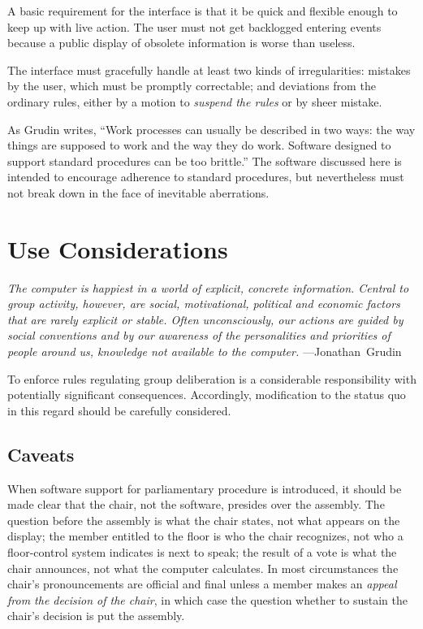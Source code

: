 \documentclass{acm_proc_article-sp}
\begin{document}
A basic requirement for the interface is that it be quick and flexible enough to keep up with live action. The user must not get backlogged entering events because a public display of obsolete information is worse than useless.

The interface must gracefully handle at least two kinds of irregularities: mistakes by the user, which must be promptly correctable; and deviations from the ordinary rules, either by a motion to \emph{suspend the rules} or by sheer mistake.

As Grudin writes, ``Work processes can usually be described in two ways: the way things are supposed to work and the way they do work. Software designed to support standard procedures can be too brittle.'' \cite{grudin:groupware} The software discussed here is intended to encourage adherence to standard procedures, but nevertheless must not break down in the face of inevitable aberrations.

\section{Use Considerations}  %

{ \it
The computer is happiest in a world of explicit, concrete information. Central to group activity, however, are social, motivational, political and economic factors that are rarely explicit or stable. Often unconsciously, our actions are guided by social conventions and by our awareness of the personalities and priorities of people around us, knowledge not available to the computer.
}
\hfill
---Jonathan~Grudin

To enforce rules regulating group deliberation is a considerable responsibility with potentially significant consequences. Accordingly, modification to the status quo in this regard should be carefully considered.

\subsection{Caveats}
\label{sec:caveats}


When software support for parliamentary procedure is introduced, it should be made clear that the chair, not the software, presides over the assembly. The question before the assembly is what the chair states, not what appears on the display; the member entitled to the floor is who the chair recognizes, not who a floor-control system indicates is next to speak; the result of a vote is what the chair announces, not what the computer calculates. In most circumstances the chair's pronouncements are official and final unless a member makes an \emph{appeal from the decision of the chair}, in which case the question whether to sustain the chair's decision is put the assembly.
\end{document}
